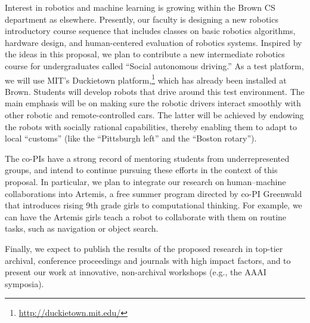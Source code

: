 Interest in robotics and machine learning is growing within the Brown
CS department as elsewhere.  Presently, our faculty is designing a new
robotics introductory course sequence that includes classes on basic
robotics algorithms, hardware design, and human-centered evaluation of
robotics systems.  Inspired by the ideas in this proposal, we plan to
contribute a new intermediate robotics course for undergraduates
called ``Social autonomous driving.''  As a test platform, we will use
MIT's Duckietown platform,\footnote{\url{http://duckietown.mit.edu/}}
which has already been installed at Brown.  Students will develop
robots that drive around this test environment.  The main emphasis
will be on making sure the robotic drivers interact smoothly with
other robotic and remote-controlled cars.  The latter will be achieved
by endowing the robots with socially rational capabilities, thereby
enabling them to adapt to local ``customs'' 
(like the ``Pittsburgh left'' and the ``Boston rotary'').



The co-PIs have a strong record of mentoring students from
underrepresented groups, and intend to continue pursuing these efforts
in the context of this proposal.  In particular, we plan to integrate
our research on human--machine collaborations into Artemis, a free
summer program directed by co-PI Greenwald that introduces rising 9th
grade girls to computational thinking.  For example, we can have the
Artemis girls teach a robot to collaborate with them on routine tasks,
such as navigation or object search.



Finally, we expect to publish the results of the proposed research in
top-tier archival, conference proceedings and journals with high
impact factors, and to present our work at innovative, non-archival
workshops (e.g., the AAAI symposia).

